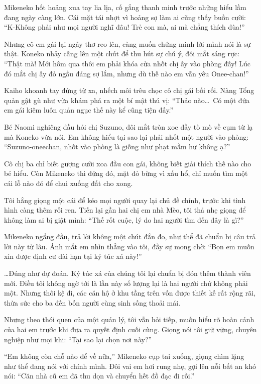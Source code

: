 ﻿\documentclass[../main.tex]{subfiles}
\begin{document}
Mikeneko hốt hoảng xua tay lia lịa, cố gắng thanh minh trước những hiểu lầm đang ngày càng lớn. Cái mặt tái nhợt vì hoảng sợ làm ai cũng thấy buồn cười: ``K-Không phải như mọi người nghĩ đâu! Trẻ con mà, ai mà chẳng thích đùa!''

Nhưng cô em gái lại ngây thơ reo lên, càng muốn chứng minh lời mình nói là sự thật. Koneko nhảy cẫng lên một chút để thu hút sự chú ý, đôi mắt sáng rực: ``Thật mà! Mới hôm qua thôi em phải khóa cửa nhốt chị ấy vào phòng đấy! Lúc đó mắt chị ấy đỏ ngầu đáng sợ lắm, nhưng dù thế nào em vẫn yêu Onee-chan!''

Kaiho khoanh tay đứng từ xa, nhếch môi trêu chọc cô chị gái bối rối. Nàng Tổng quản gật gù như vừa khám phá ra một bí mật thú vị: ``Thảo nào\dots\ Có một đứa em gái kiêm luôn quản ngục thế này kể cũng tiện đấy.''

Bé Naomi nghiêng đầu hỏi chị Suzuno, đôi mắt tròn xoe đầy tò mò về cụm từ lạ mà Koneko vừa nói. Em không hiểu tại sao lại phải nhốt một người vào phòng: ``Suzuno-oneechan, nhốt vào phòng là giống như phạt mầm hư không ạ?''

Cô chị ba chỉ biết gượng cười xoa đầu con gái, không biết giải thích thế nào cho bé hiểu. Còn Mikeneko thì đứng đó, mặt đỏ bừng vì xấu hổ, chỉ muốn tìm một cái lỗ nào đó để chui xuống đất cho xong.

Tôi hắng giọng một cái để kéo mọi người quay lại chủ đề chính, trước khi tình hình càng thêm rối ren. Tiến lại gần hai chị em nhà Mèo, tôi thả nhẹ giọng để không làm ai bị giật mình: ``Thế rốt cuộc, lý do hai người tìm đến đây là gì?''

Mikeneko ngẩng đầu, trả lời không một chút đắn đo, như thể đã chuẩn bị câu trả lời này từ lâu. Ánh mắt em nhìn thẳng vào tôi, đầy sự mong chờ: ``Bọn em muốn xin được định cư dài hạn tại ký túc xá này!''

\dots Đúng như dự đoán. Ký túc xá của chúng tôi lại chuẩn bị đón thêm thành viên mới. Điều tôi không ngờ tới là lần này số lượng lại là hai người chứ không phải một. Nhưng thôi kệ đi, các căn hộ ở khu tầng trên vốn được thiết kế rất rộng rãi, thừa sức cho ba đến bốn người cùng sinh sống thoải mái.

Nhưng theo thói quen của một quản lý, tôi vẫn hỏi tiếp, muốn hiểu rõ hoàn cảnh của hai em trước khi đưa ra quyết định cuối cùng. Giọng nói tôi giữ vững, chuyên nghiệp như mọi khi: ``Tại sao lại chọn nơi này?''

``Em không còn chỗ nào để về nữa,'' Mikeneko cụp tai xuống, giọng chìm lặng như thể đang nói với chính mình. Đôi vai em hơi rung nhẹ, gợi lên nỗi bất an khó nói: ``Căn nhà cũ em đã thu dọn và chuyển hết đồ đạc đi rồi.''
\end{document}
